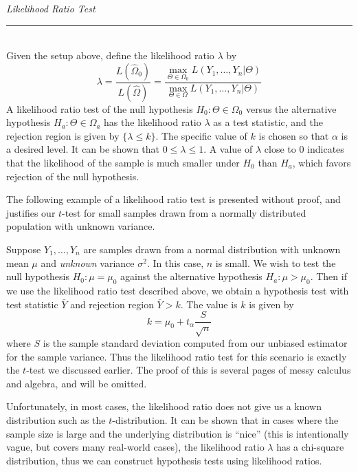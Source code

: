 \documentclass[notes.tex]{subfiles}
\begin{document}
\begin{framed}
\emph{Likelihood Ratio Test}\\
  \rule{\dimexpr{}\fboxrule}{.1pt} \\
Given the setup above, define the likelihood ratio $\lambda$ by 
\[
\lambda = \dfrac{L(\hat{\Omega}_0) }{L(\hat{\Omega}) } = \dfrac{ \max_{\Theta \in \Omega_0} L(Y_1, \dots, Y_n|\Theta)}{ \max_{\Theta \in \Omega} L(Y_1, \dots, Y_n|\Theta) }
\]
A likelihood ratio test of the null hypothesis $H_0: \Theta \in \Omega_0$ versus the alternative hypothesis $H_a: \Theta \in \Omega_a$ has the likelihood ratio $\lambda$ as a test statistic, and the rejection region is given by $\{ \lambda \leq k\}$. The specific value of $k$ is chosen so that $\alpha$ is a desired level. It can be shown that $0 \leq \lambda \leq 1$. A value of $\lambda$ close to 0 indicates that the likelihood of the sample is much smaller under $H_0$ than $H_a$, which favors rejection of the null hypothesis.
\end{framed}

The following example of a likelihood ratio test is presented without proof, and justifies our $t$-test for small samples drawn from a normally distributed population with unknown variance.

\begin{example}
Suppose $Y_1, \dots, Y_n$ are samples drawn from a normal distribution with unknown mean $\mu$ and \emph{unknown} variance $\sigma^2$. In this case, $n$ is small. We wish to test the null hypothesis $H_0: \mu = \mu_0$ against the alternative hypothesis $H_a: \mu > \mu_0$. Then if we use the likelihood ratio test described above, we obtain a hypothesis test with test statistic $\bar{Y}$ and rejection region $\bar{Y} > k$. The value is $k$ is given by
\[
k = \mu_0 + t_\alpha\frac{S}{\sqrt{n}}
\]
where $S$ is the sample standard deviation computed from our unbiased estimator for the sample variance. Thus the likelihood ratio test for this scenario is exactly the $t$-test we discussed earlier. The proof of this is several pages of messy calculus and algebra, and will be omitted.
\end{example}


Unfortunately, in most cases, the likelihood ratio does not give us a known distribution such as the $t$-distribution. It can be shown that in cases where the sample size is large and the underlying distribution is ``nice'' (this is intentionally vague, but covers many real-world cases), the likelihood ratio $\lambda$ has a chi-square distribution, thus we can construct hypothesis tests using likelihood ratios.
\end{document}
